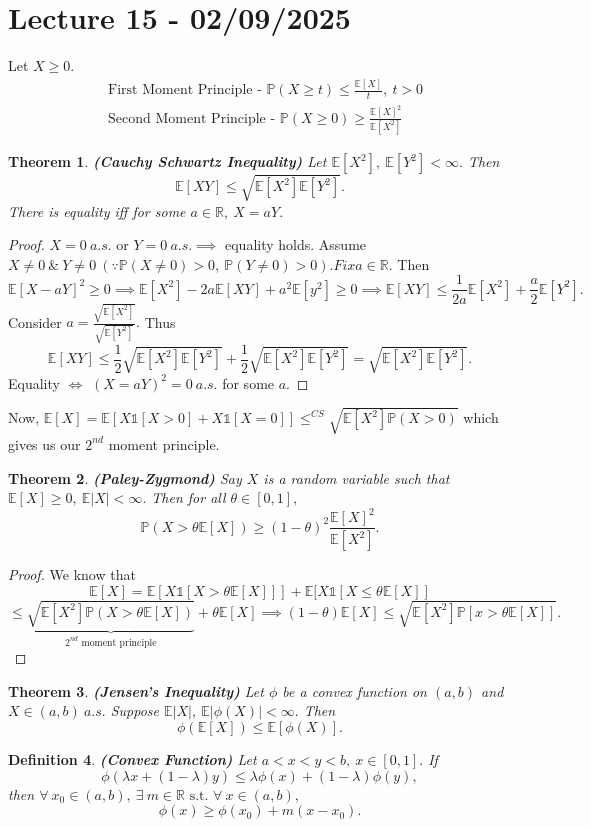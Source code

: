 \documentclass{article}
\newcommand{\1}{\mathds{1}}
\newcommand{\R}{\mathbb{R}}
\newcommand{\E}{\mathbb{E}}
\newcommand{\PB}{\mathbb{P}}
\newcommand{\lf}{\left}
\newcommand{\rg}{\right}
\newcommand{\f}[2]{\frac{#1}{#2}}
\newcommand{\st}{\text{ s.t. }}
\newcommand{\card}[1]{\lf\vert #1\rg\vert}
\newcommand{\ar}{\ \&\ }
\newtheorem{theorem}{Theorem}[section]
\newtheorem{definition}[theorem]{Definition}
\begin{document}
\section{Lecture 15 - 02/09/2025}
Let $X\geq 0.$
\[
\begin{array}{ll}
     &  \text{First Moment Principle - }\PB(X\geq t)\leq \f{\E[X]}t,\ t>0\\
     & \text{Second Moment Principle - }\PB(X\geq 0)\geq \f{\E[X]^2}{\E[X^2]}
\end{array}
\]
\begin{theorem}\textbf{(Cauchy Schwartz Inequality)}
    Let $\E[X^2],\ \E[Y^2]<\infty .$ Then $$\E[XY]\leq\sqrt{\E[X^2]\E[Y^2]}.$$ There is equality iff for some $a\in\R,\ X=aY.$
\end{theorem}
\begin{proof}
    $X=0\ a.s.$ or $Y=0\ a.s.\implies$ equality holds. Assume $X\ne 0\ar Y\ne 0\ (\because \PB(X\ne 0)>0,\ \PB(Y\ne 0)>0). Fix a\in\R.$ Then $$\E[X-aY]^2\geq 0\implies \E[X^2]-2a\E[XY]+a^2\E[y^2]\geq 0\implies\E[XY]\leq \f 1{2a}\E[X^2]+\f a2\E[Y^2].$$Consider $a=\f{\sqrt{\E[X^2]}}{\sqrt{\E[Y^2]}}.$ Thus $$\E[XY]\leq \f12\sqrt{\E[X^2]\E[Y^2]}+\f12\sqrt{\E[X^2]\E[Y^2]}=\sqrt{\E[X^2]\E[Y^2]}.$$ Equality $\iff$ $(X=aY)^2=0\ a.s.$ for some $a.$
\end{proof}
Now, $\E[X]=\E[X\1[X> 0]+X\1[X=0]]\leq^{CS}\sqrt{\E[X^2]\PB(X>0)}$ which gives us our $2^{nd}$ moment principle.
\begin{theorem}\textbf{(Paley-Zygmond)}
Say $X$ is a random variable such that $\E[X]\geq 0,\ \E\card{X}<\infty.$ Then for all $\theta\in [0,1],$
    $$\PB(X>\theta\E[X])\geq (1-\theta)^2\f{\E[X]^2}{\E[X^2]}.$$
\end{theorem}
\begin{proof}
    We know that $$\E[X]=\E[X\1[X>\theta\E[X]]]+\E[X\1[X\leq\theta\E[X]]$$ $$\leq \underbrace{\sqrt{\E[X^2]\PB(X>\theta\E[X])}}_{2^{nd}\text{ moment principle}}+\theta\E[X]\implies (1-\theta)\E[X]\leq \sqrt{\E[X^2]\PB[x>\theta\E[X]]}.$$
\end{proof}
\begin{theorem}\textbf{(Jensen's Inequality)}
    Let $\phi$ be a convex function on $(a,b)$ and $X\in(a,b)\ a.s.$ Suppose $\E\card{X},\ \E\card{\phi(X)}<\infty.$ Then $$\phi(\E [X])\leq \E[\phi(X)].$$
\end{theorem}
\begin{definition}\textbf{(Convex Function)}
    Let $a<x<y<b,\ x\in [0,1].$ If $$\phi(\lambda x+(1-\lambda)y)\leq \lambda \phi(x)+(1-\lambda)\phi(y),$$ then $\forall\ x_0\in (a,b),\ \exists\ m\in\R\st \forall\ x\in (a,b),$ $$\phi(x)\geq \phi(x_0)+m(x-x_0).$$
\end{definition}
\end{document}
